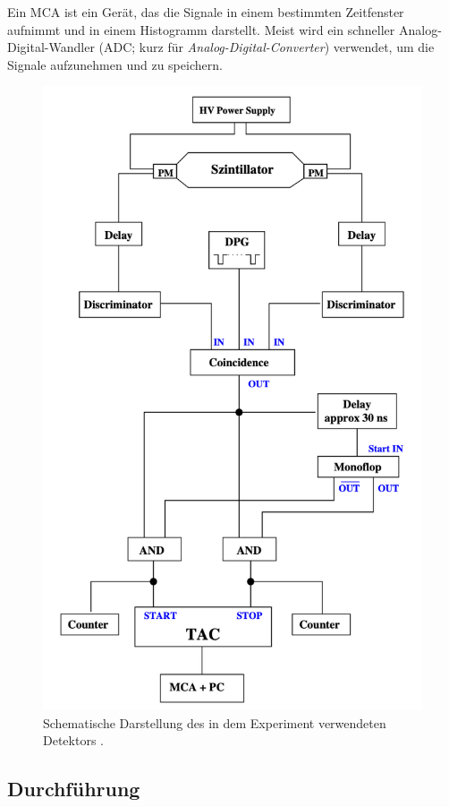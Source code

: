 Ein MCA ist ein Gerät, das die Signale in einem bestimmten Zeitfenster aufnimmt und in einem Histogramm darstellt.
Meist wird ein schneller Analog-Digital-Wandler (ADC; kurz für \textit{Analog-Digital-Converter}) verwendet, um die Signale aufzunehmen und zu speichern.
\begin{figure}[H]
    \centering
    \includegraphics[width=.7\textwidth]{content/detektor.png}
    \caption{Schematische Darstellung des in dem Experiment verwendeten Detektors \cite{Anleitung01}.}
    \label{fig:detektor}
\end{figure}

\subsection{Durchführung}\label{subsec:Durchfuehrung}

